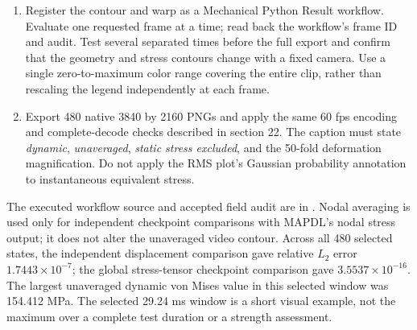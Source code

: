 \documentclass[10pt,a4paper]{article}
\begin{document}
\begin{enumerate}
\item Register the contour and warp as a Mechanical Python Result workflow. Evaluate one requested frame at a time; read back the workflow's frame ID and audit. Test several separated times before the full export and confirm that the geometry and stress contours change with a fixed camera. Use a single zero-to-maximum color range covering the entire clip, rather than rescaling the legend independently at each frame.
\item Export 480 native 3840 by 2160 PNGs and apply the same 60 fps encoding and complete-decode checks described in section 22. The caption must state \emph{dynamic}, \emph{unaveraged}, \emph{static stress excluded}, and the 50-fold deformation magnification. Do not apply the RMS plot's Gaussian probability annotation to instantaneous equivalent stress.
\end{enumerate}

The executed workflow source and accepted field audit are in . Nodal averaging is used only for independent checkpoint comparisons with MAPDL's nodal stress output; it does not alter the unaveraged video contour. Across all 480 selected states, the independent displacement comparison gave relative $L_2$ error $1.7443\times10^{-7}$; the global stress-tensor checkpoint comparison gave $3.5537\times10^{-16}$. The largest unaveraged dynamic von Mises value in this selected window was 154.412 MPa. The selected 29.24 ms window is a short visual example, not the maximum over a complete test duration or a strength assessment.

\end{document}

